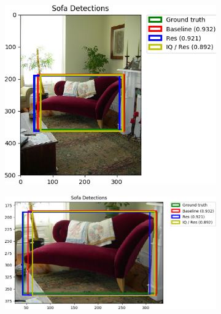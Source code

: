 \begin{figure}[H]
    \centering
    \begin{subfigure}[b]{0.45\textwidth}
        \center
        \includegraphics[width=\textwidth]{Figs/Results/000116_res.png}
        \caption{}\label{fig:}
    \end{subfigure}
    \begin{subfigure}[b]{0.45\textwidth}
        \center
        \includegraphics[width=\textwidth]{Figs/Results/000116_reszoom.png}
        \caption{}\label{fig:}
    \end{subfigure}
    \caption{}
    \label{fig:}
\end{figure} 



